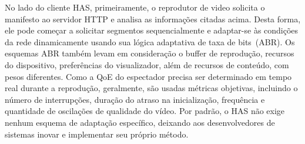 No lado do cliente HAS, primeiramente, o reprodutor de video solicita o manifesto ao servidor HTTP e analisa as informações citadas acima. Desta forma, ele pode começar a solicitar segmentos sequencialmente e adaptar-se às condições da rede dinamicamente usando sua lógica adaptativa de taxa de bits~(ABR). Os esquemas ABR também levam em consideração o buffer de reprodução, recursos do dispositivo, preferências do visualizador, além de recursos de conteúdo, com pesos diferentes. 
Como a QoE do espectador precisa ser determinado em tempo real durante a reprodução, geralmente, são usadas métricas objetivas, incluindo o número de interrupções, duração do atraso na inicialização, frequência e quantidade de oscilações de qualidade do vídeo. Por padrão, o HAS não exige nenhum esquema de adaptação específico, deixando aos desenvolvedores de sistemas inovar e implementar seu próprio método.




